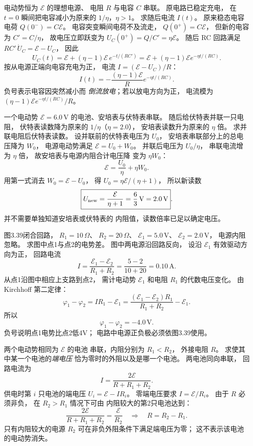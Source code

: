 电动势恒为 $\mathcal E$ 的理想电源、
电阻 $R$ 与电容 $C$ 串联。
原电路已稳定充电，
在 $t=0$ 瞬间把电容减小为原来的
$1/\eta$，$\eta>1$。
求随后电流 $I(t)$。
\exsolution
原来稳态电容电荷
$Q(0^-)=C\mathcal E$。
电容突变瞬间电荷不及流走，
$Q(0^+)=C\mathcal E$，
但新的电容为 $C'=C/\eta$，
故电压立即跃变为
$U_C(0^+)=Q/C'=\eta\mathcal E$。
随后 RC 回路满足
$RC'\,\dot U_C=\mathcal E-U_C$，
因此
\[
U_C(t)=\mathcal E+
(\eta-1)\mathcal E\,e^{-t/(RC')}
=\mathcal E+(\eta-1)\mathcal E
e^{-\eta t/(RC)}.
\]
按从电源正端向电容充电为正，
电流 $I=(\mathcal E-U_C)/R$：
\[
\boxed{I(t)=
-\frac{(\eta-1)\mathcal E}{R}
e^{-\eta t/(RC)}}.
\]
\excheck 负号表示电容因突然减小而
\emph{倒流放电}；若以放电方向为正，
电流模为 $(\eta-1)\mathcal E
e^{-\eta t/(RC)}/R$。

一个电动势 $\mathcal E=6.0\,\mathrm V$
的电池、安培表与伏特表串联。
随后给伏特表并联一只电阻，
伏特表读数降为原来的
$1/\eta$（$\eta=2.0$），
安培表读数升为原来的 $\eta$ 倍。
求并联电阻后伏特表读数。
\exsolution
设并联前的伏特表电压为 $U_0$，
安培表串联部分上的总电压降为 $W_0$，
电源电动势满足
$\mathcal E=U_0+W_0$。
并联后电压为 $U_0/\eta$，
串联电流增为 $\eta$ 倍，
故安培表与电源内阻合计电压降
变为 $\eta W_0$：
\[
\mathcal E=\frac{U_0}{\eta}+\eta W_0.
\]
用第一式消去 $W_0=\mathcal E-U_0$，
得
$U_0=\eta\mathcal E/(\eta+1)$，
所以新读数
\[
\boxed{U_{\rm new}=\frac{\mathcal E}{\eta+1}
=\frac6{3}\,\mathrm V=2.0\,\mathrm V}.
\]
\excheck 并不需要单独知道安培表或伏特表的
内阻值，读数倍率已足以确定电压。

图3.39闭合回路，
$R_1=10\,\Omega$、
$R_2=20\,\Omega$、
$\mathcal E_1=5.0\,\mathrm V$、
$\mathcal E_2=2.0\,\mathrm V$，
电源内阻忽略。
求图中点1与点2的电势差。
\exsolution
图中两电源沿回路反向，
设沿 $\mathcal E_1$ 有效驱动方向为正，
回路电流
\[
I=\frac{\mathcal E_1-\mathcal E_2}{R_1+R_2}
=\frac{5-2}{10+20}=0.10\,\mathrm A.
\]
从点1沿图中相应上支路到点2，
需计电动势 $\mathcal E_1$
和电阻 $R_1$ 的代数电压变化。
由 Kirchhoff 第二定律：
\[
\varphi_1-\varphi_2
=IR_1-\mathcal E_1
=\frac{(\mathcal E_1-\mathcal E_2)R_1}
{R_1+R_2}-\mathcal E_1.
\]
所以
\[
\boxed{\varphi_1-\varphi_2=-4.0\,\mathrm V}.
\]
\excheck 负号说明点1电势比点2低4V；
电路中电源正负极必须依图3.39使用。

两个电动势相同为 $\mathcal E$ 的电池
串联，内阻分别为 $R_1<R_2$，
外接电阻 $R$。
求使其中某一个电池的\emph{端电压}
恰为零时的外阻以及是哪一个电池。
\exsolution
两电池同向串联，
回路电流为
\[
I=\frac{2\mathcal E}{R+R_1+R_2}.
\]
供电时第 $i$ 只电池的端电压
$U_i=\mathcal E-IR_i$。
零端电压要求
$I=\mathcal E/R_i$。
由于 $R$ 必须非负，
在 $R_2>R_1$ 情况下可由
内阻较大的第2只电池达到：
\[
\frac{2\mathcal E}{R+R_1+R_2}
=\frac{\mathcal E}{R_2}
\quad\Longrightarrow\quad
\boxed{R=R_2-R_1}.
\]
\excheck 只有内阻较大的电源
$R_2$ 可在非负外阻条件下满足端电压为零；
这不表示该电池的电动势消失。

